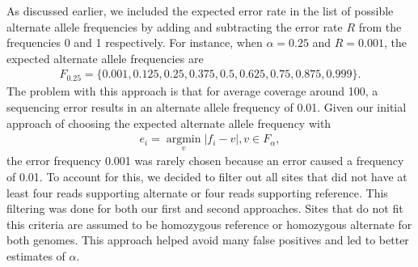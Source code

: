 \documentclass[12pt]{article}
\begin{document}
As discussed earlier, we included the expected error rate in the list of possible alternate allele frequencies by adding and subtracting the error rate $R$ from the frequencies 0 and 1 respectively. For instance, when $\alpha=0.25$ and $R=0.001$, the expected alternate allele frequencies are
\begin{align}
F_{0.25}=\{0.001, 0.125, 0.25, 0.375, 0.5, 0.625, 0.75, 0.875, 0.999\}. 
\end{align}
The problem with this approach is that for average coverage around 100, a sequencing error results in an alternate allele frequency of 0.01. Given our initial approach of choosing the expected alternate allele frequency with
\begin{align}
e_i = \underset{v}{\operatorname{argmin}} | f_i - v |, v \in F_\alpha,
\end{align}
the error frequency 0.001 was rarely chosen because an error caused a frequency of 0.01. To account for this, we decided to filter out all sites that did not have at least four reads supporting alternate or four reads supporting reference. This filtering was done for both our first and second approaches.  Sites that do not fit this criteria are assumed to be homozygous reference or homozygous alternate for both genomes. This approach helped avoid many false positives and led to better estimates of $\alpha$. 
\end{document}
